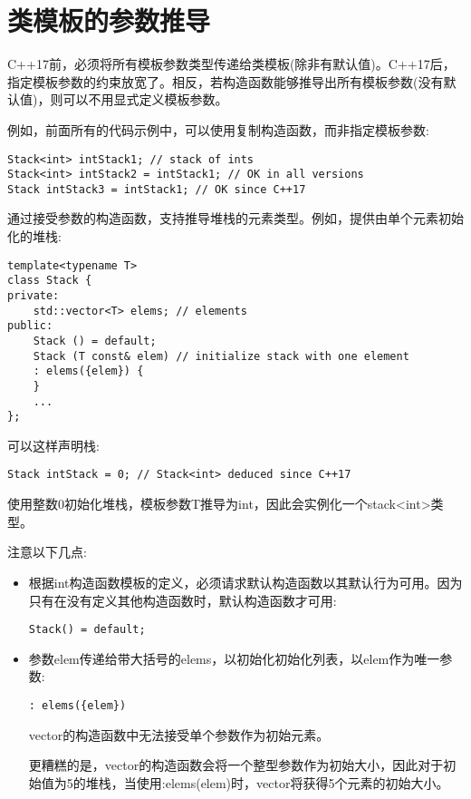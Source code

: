 \section{类模板的参数推导}

C++17前，必须将所有模板参数类型传递给类模板(除非有默认值)。C++17后，指定模板参数的约束放宽了。相反，若构造函数能够推导出所有模板参数(没有默认值)，则可以不用显式定义模板参数。

例如，前面所有的代码示例中，可以使用复制构造函数，而非指定模板参数:

\begin{lstlisting}[style=styleCXX]
Stack<int> intStack1; // stack of ints
Stack<int> intStack2 = intStack1; // OK in all versions
Stack intStack3 = intStack1; // OK since C++17
\end{lstlisting}

通过接受参数的构造函数，支持推导堆栈的元素类型。例如，提供由单个元素初始化的堆栈:

\begin{lstlisting}[style=styleCXX]
template<typename T>
class Stack {
private:
	std::vector<T> elems; // elements
public:
	Stack () = default;
	Stack (T const& elem) // initialize stack with one element
	: elems({elem}) {
	}
	...
};
\end{lstlisting}

可以这样声明栈:

\begin{lstlisting}[style=styleCXX]
Stack intStack = 0; // Stack<int> deduced since C++17
\end{lstlisting}

使用整数0初始化堆栈，模板参数T推导为int，因此会实例化一个stack<int>类型。

注意以下几点:

\begin{itemize}
\item 
根据int构造函数模板的定义，必须请求默认构造函数以其默认行为可用。因为只有在没有定义其他构造函数时，默认构造函数才可用:
\begin{lstlisting}[style=styleCXX]
Stack() = default;
\end{lstlisting}

\item 
参数elem传递给带大括号的elems，以初始化初始化列表，以elem作为唯一参数:
\begin{lstlisting}[style=styleCXX]
: elems({elem})
\end{lstlisting}
vector的构造函数中无法接受单个参数作为初始元素。

\begin{tcolorbox}[colback=webgreen!5!white,colframe=webgreen!75!black]
\hspace*{0.75cm}更糟糕的是，vector的构造函数会将一个整型参数作为初始大小，因此对于初始值为5的堆栈，当使用:elems(elem)时，vector将获得5个元素的初始大小。
\end{tcolorbox}

\end{itemize}


